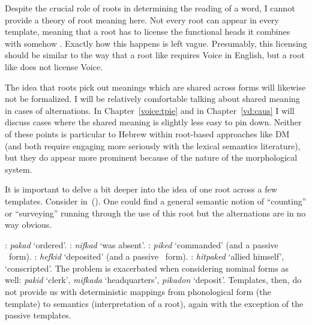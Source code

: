 \begin{exe}
\begin{xlist}
\begin{exe}
\begin{exe}
\begin{exe}
\begin{exe}
\begin{xlist}
\begin{exe}
\begin{xlist}
\begin{xlist}
\begin{xlist}
\begin{exe}
\begin{xlist}
\begin{exe}
\begin{exe}
\begin{exe}
\begin{exe}
\begin{xlist}
\begin{exe}
\begin{xlist}
\begin{exe}
\begin{exe}
\begin{xlist}
Despite the crucial role of roots in determining the reading of a word, I cannot provide a theory of root meaning here. Not every root can appear in every template, meaning that a root has to license the functional heads it combines with somehow \citep{harleynoyer00}. Exactly how this happens is left vague. Presumably, this licensing should be similar to the way that a root like  requires Voice in English, but a root like  does not license Voice.

The idea that roots pick out meanings which are shared across forms will likewise not be formalized. I will be relatively comfortable talking about shared meaning in cases of alternations. In Chapter~\ref{voice:tpie} and in Chapter~\ref{vd:caus} I will discuss cases where the shared meaning is slightly less easy to pin down. Neither of these points is particular to Hebrew within root-based approaches like DM (and both require engaging more seriously with the lexical semantics literature), but they do appear more prominent because of the nature of the morphological system.

It is important to delve a bit deeper into the idea of one root across a few templates. Consider  in~(\nextx).  One could find a general semantic notion of ``counting'' or ``surveying'' running through the use of this root but the alternations are in no way obvious. 
 \begin{exe}
 \ex \label{ex:naive-pkd} 
 \begin{xlist} 
   \ex  \tkal: \emph{pakad} `ordered'. 
   \ex  \tnif: \emph{nifkad} `was absent'. 
   \ex  \tpie: \emph{piked} `commanded' (and a passive \tpua~form). 
   \ex  \thif: \emph{hefkid} `deposited' (and a passive \thuf~form). 
   \ex  \thit: \emph{hitpaked} `allied himself', `conscripted'. 
 \z
\z 
The problem is exacerbated when considering nominal forms as well: \emph{pakid} `clerk', \emph{mifkada} `headquarters', \emph{pikadon} `deposit'. Templates, then, do not provide us with deterministic mappings from phonological form (the template) to semantics (interpretation of a root), again with the exception of the passive templates.


\end{xlist}
\end{exe}
\end{xlist}
\end{exe}
\end{exe}
\end{xlist}
\end{exe}
\end{xlist}
\end{exe}
\end{exe}
\end{exe}
\end{exe}
\end{xlist}
\end{exe}
\end{xlist}
\end{xlist}
\end{xlist}
\end{exe}
\end{xlist}
\end{exe}
\end{exe}
\end{exe}
\end{exe}
\end{xlist}
\end{exe}
